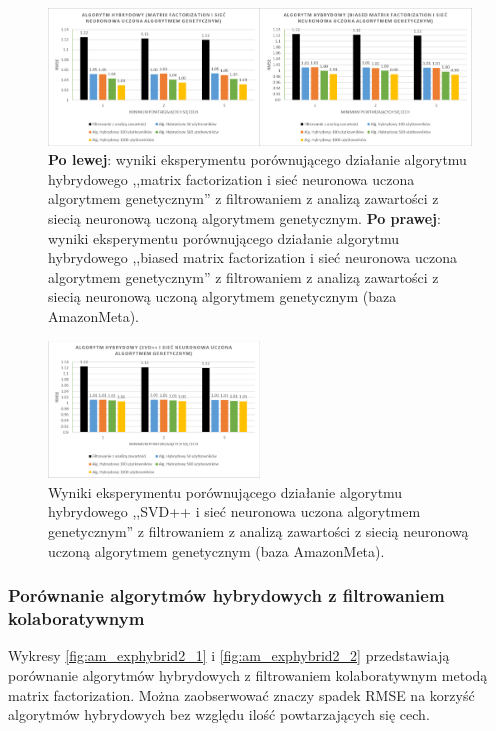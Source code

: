 \documentclass[twoside]{iisthesis}
\begin{document}
		\begin{figure}
			\centering
			\includegraphics[width=1\textwidth]{am_exphybrid1_4}			
			\caption{\textbf{Po lewej}: wyniki eksperymentu porównującego działanie algorytmu hybrydowego ,,matrix factorization i sieć neuronowa uczona algorytmem genetycznym'' z filtrowaniem z analizą zawartości z siecią neuronową uczoną algorytmem genetycznym. \textbf{Po prawej}: wyniki eksperymentu porównującego działanie algorytmu hybrydowego ,,biased matrix factorization i sieć neuronowa uczona algorytmem genetycznym'' z filtrowaniem z analizą zawartości z siecią neuronową uczoną algorytmem genetycznym (baza AmazonMeta).}
			\label{fig:am_exphybrid1_4}
		\end{figure}

		\begin{figure}
			\centering
			\includegraphics[width=0.5\textwidth]{am_exphybrid1_5}			
			\caption{Wyniki eksperymentu porównującego działanie algorytmu hybrydowego ,,SVD++ i sieć neuronowa uczona algorytmem genetycznym'' z filtrowaniem z analizą zawartości z siecią neuronową uczoną algorytmem genetycznym (baza AmazonMeta).}
			\label{fig:am_exphybrid1_5}
		\end{figure}

		\subsubsection{Porównanie algorytmów hybrydowych z filtrowaniem kolaboratywnym}
		
		Wykresy \ref{fig:am_exphybrid2_1} i \ref{fig:am_exphybrid2_2} przedstawiają porównanie algorytmów hybrydowych z filtrowaniem kolaboratywnym metodą matrix factorization. Można zaobserwować znaczy spadek RMSE na korzyść algorytmów hybrydowych bez względu ilość powtarzających się cech.
		
\end{document}
